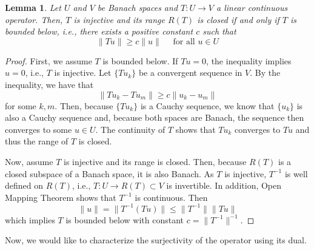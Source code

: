 \documentclass{article}
\newtheorem{lemma}{Lemma}
\begin{document}
\begin{lemma}
    Let \(U\) and \( V\) be Banach spaces and \(T:U\to V\) a linear 
    continuous operator. Then, \(T\) is injective and its range \(R(T)\) is 
    closed if and only if  \(T\) is bounded below, i.e., there exists 
    a positive constant \(c\) such that 
    \begin{displaymath}
        \lVert Tu \rVert \ge c\lVert u \rVert
        \quad \text{ for all } u\in U
    \end{displaymath}
\end{lemma}
\begin{proof}
    First, we assume \(T\) is bounded below. If \(Tu=0\), the inequality 
    implies \(u=0\), i.e., \(T\) is injective. Let \(\{Tu_k\}\) be a convergent sequence in \(V\). By the inequality, we have that
    \begin{displaymath}
        \lVert Tu_k - Tu_m \rVert \ge c\lVert u_k - u_m \rVert
    \end{displaymath}
    for some \(k,m\). Then, because \(\{Tu_k\}\) is a Cauchy sequence, we know that \(\{u_k\}\) is also a Cauchy sequence and, because both spaces are Banach, the sequence then converges to some \(u\in U\). The continuity of \(T\) shows that \(Tu_k\) converges to \(Tu\) and thus the range of \(T\) is closed. 

    Now, assume \(T\) is injective and its range is closed. Then, because 
    \(R(T)\) is a closed subspace of a Banach space, it is also Banach. As \( T\) is injective, \(T^{-1}\) is well defined on \(R(T)\), i.e., 
    \(T:U\to R(T)\subset V\) is invertible. In addition, Open Mapping Theorem 
    shows that \(T^{-1}\) is continuous. Then
    \begin{displaymath}
        \lVert u \rVert = \lVert T^{-1}(Tu) \rVert 
        \le \lVert T^{-1} \rVert \lVert Tu \rVert 
    \end{displaymath}
    which implies \(T\) is bounded below with constant 
    \(c = \lVert T^{-1} \rVert^{-1}\).
\end{proof}

Now, we would like to characterize the surjectivity of the operator using its dual.
\end{document}
